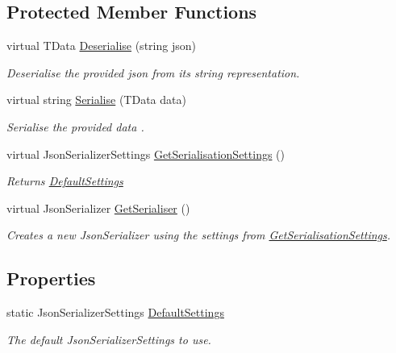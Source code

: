 \subsection*{Protected Member Functions}
\begin{DoxyCompactItemize}
\item 
virtual T\+Data \hyperlink{classCqrs_1_1Azure_1_1BlobStorage_1_1TableEntity_a5a5b53a3a2427a368f2ebe404f04f4ff_a5a5b53a3a2427a368f2ebe404f04f4ff}{Deserialise} (string json)
\begin{DoxyCompactList}\small\item\em Deserialise the provided {\itshape json}  from its string representation. \end{DoxyCompactList}\item 
virtual string \hyperlink{classCqrs_1_1Azure_1_1BlobStorage_1_1TableEntity_af7467b1194756dd32029dc40f690c4ad_af7467b1194756dd32029dc40f690c4ad}{Serialise} (T\+Data data)
\begin{DoxyCompactList}\small\item\em Serialise the provided {\itshape data} . \end{DoxyCompactList}\item 
virtual Json\+Serializer\+Settings \hyperlink{classCqrs_1_1Azure_1_1BlobStorage_1_1TableEntity_aa36736f412df5a1667d7b0e5c0bd3035_aa36736f412df5a1667d7b0e5c0bd3035}{Get\+Serialisation\+Settings} ()
\begin{DoxyCompactList}\small\item\em Returns \hyperlink{classCqrs_1_1Azure_1_1BlobStorage_1_1TableEntity_ab7a9041c7d8e5237cfb81ad98b6b3980_ab7a9041c7d8e5237cfb81ad98b6b3980}{Default\+Settings} \end{DoxyCompactList}\item 
virtual Json\+Serializer \hyperlink{classCqrs_1_1Azure_1_1BlobStorage_1_1TableEntity_a18d1b7ecf408a921cd0e2e6a8d0f6c74_a18d1b7ecf408a921cd0e2e6a8d0f6c74}{Get\+Serialiser} ()
\begin{DoxyCompactList}\small\item\em Creates a new Json\+Serializer using the settings from \hyperlink{classCqrs_1_1Azure_1_1BlobStorage_1_1TableEntity_aa36736f412df5a1667d7b0e5c0bd3035_aa36736f412df5a1667d7b0e5c0bd3035}{Get\+Serialisation\+Settings}. \end{DoxyCompactList}\end{DoxyCompactItemize}
\subsection*{Properties}
\begin{DoxyCompactItemize}
\item 
static Json\+Serializer\+Settings \hyperlink{classCqrs_1_1Azure_1_1BlobStorage_1_1TableEntity_ab7a9041c7d8e5237cfb81ad98b6b3980_ab7a9041c7d8e5237cfb81ad98b6b3980}{Default\+Settings}
\begin{DoxyCompactList}\small\item\em The default Json\+Serializer\+Settings to use. \end{DoxyCompactList}\end{DoxyCompactItemize}


